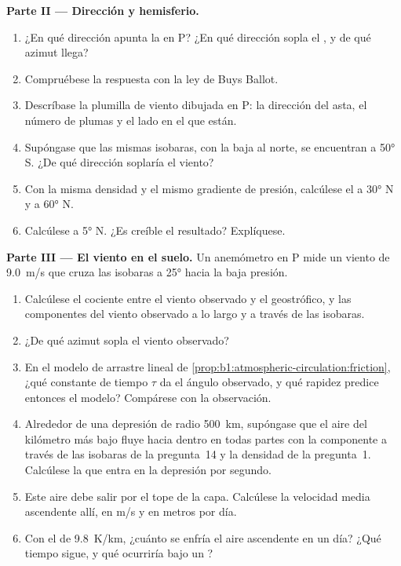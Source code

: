 \begin{problem}
\medskip
\noindent\textbf{Parte II --- Dirección y hemisferio.}
\begin{enumerate}[resume]
  \item ¿En qué dirección apunta la  en P? ¿En qué dirección sopla el , y de qué azimut llega?
  \item Compruébese la respuesta con la ley de Buys Ballot.
  \item Descríbase la plumilla de viento dibujada en P: la dirección del asta, el número de plumas y el lado en el que están.
  \item Supóngase que las mismas isobaras, con la baja al norte, se encuentran a \ang{50} S. ¿De qué dirección soplaría el viento?
  \item Con la misma densidad y el mismo gradiente de presión, calcúlese el  a \ang{30} N y a \ang{60} N.
  \item Calcúlese a \ang{5} N. ¿Es creíble el resultado? Explíquese.
\end{enumerate}

\medskip
\noindent\textbf{Parte III --- El viento en el suelo.} Un anemómetro en P mide un viento de \qty{9.0}{m/s} que cruza las isobaras a \ang{25} hacia la baja presión.
\begin{enumerate}[resume]
  \item Calcúlese el cociente entre el viento observado y el geostrófico, y las componentes del viento observado a lo largo y a través de las isobaras.
  \item ¿De qué azimut sopla el viento observado?
  \item En el modelo de arrastre lineal de \cref{prop:b1:atmospheric-circulation:friction}, ¿qué constante de tiempo $\tau$ da el ángulo observado, y qué rapidez predice entonces el modelo? Compárese con la observación.
  \item Alrededor de una depresión de radio \qty{500}{km}, supóngase que el aire del kilómetro más bajo fluye hacia dentro en todas partes con la componente a través de las isobaras de la pregunta~14 y la densidad de la pregunta~1. Calcúlese la  que entra en la depresión por segundo.
  \item Este aire debe salir por el tope de la capa. Calcúlese la velocidad media ascendente allí, en \unit{m/s} y en metros por día.
  \item Con el  de \qty{9.8}{K/km}, ¿cuánto se enfría el aire ascendente en un día? ¿Qué tiempo sigue, y qué ocurriría bajo un ?
\end{enumerate}


\end{problem}
